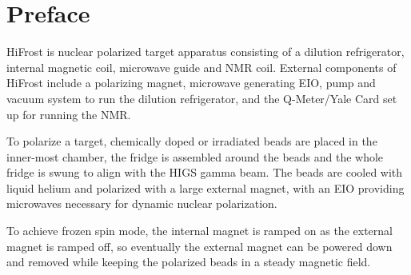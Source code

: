 \chapter*{Preface}
\thispagestyle{empty} 


HiFrost is nuclear polarized target apparatus consisting of a dilution refrigerator, internal magnetic coil, microwave guide and NMR coil.  External components of HiFrost include a polarizing magnet, microwave generating EIO, pump and vacuum system to run the dilution refrigerator, and the Q-Meter/Yale Card set up for running the NMR. 


To polarize a target, chemically doped or irradiated beads are placed in the inner-most chamber, the fridge is assembled around the beads and the whole fridge is swung to align with the HIGS gamma beam.  The beads are cooled with liquid helium and polarized with a large external magnet, with an EIO providing microwaves necessary for dynamic nuclear polarization.


To achieve frozen spin mode, the internal magnet is ramped on as the external magnet is ramped off, so eventually the external magnet can be powered down and removed while keeping the polarized beads in a steady magnetic field.